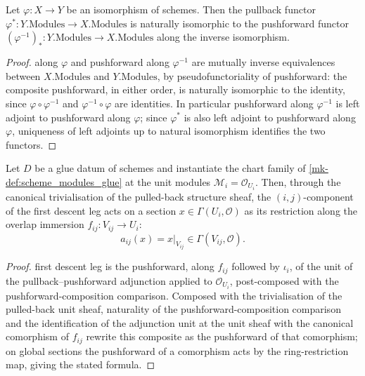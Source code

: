 \begin{lemma}
  \label{mk-lem:pullback_iso_pushforward_inv}
  \leanok
  Let \(\varphi : X \to Y\) be an isomorphism of schemes. Then the pullback
  functor \(\varphi^{*} : Y.\mathrm{Modules} \to X.\mathrm{Modules}\) is
  naturally isomorphic to the pushforward functor
  \((\varphi^{-1})_{*} : Y.\mathrm{Modules} \to X.\mathrm{Modules}\) along
  the inverse isomorphism.
\end{lemma}
\begin{proof}
  \leanokPushforward along \(\varphi\) and pushforward along \(\varphi^{-1}\) are
  mutually inverse equivalences between \(X.\mathrm{Modules}\) and
  \(Y.\mathrm{Modules}\), by pseudofunctoriality of pushforward: the
  composite pushforward, in either order, is naturally isomorphic to the
  identity, since \(\varphi \circ \varphi^{-1}\) and
  \(\varphi^{-1} \circ \varphi\) are identities. In particular pushforward
  along \(\varphi^{-1}\) is left adjoint to pushforward along \(\varphi\);
  since \(\varphi^{*}\) is also left adjoint to pushforward along
  \(\varphi\), uniqueness of left adjoints up to natural isomorphism
  identifies the two functors.
\end{proof}

\begin{lemma}
  \label{mk-lem:glue_legA_unit_restriction}
  \leanok
  Let \(D\) be a glue datum of schemes and instantiate the chart family of
  \ref{mk-def:scheme_modules_glue} at the unit modules
  \(\mathcal M_i = \mathcal O_{U_i}\). Then, through the canonical
  trivialisation of the pulled-back structure sheaf, the \((i,j)\)-component
  of the first descent leg acts on a section \(x \in \Gamma(U_i, \mathcal
  O)\) as its restriction along the overlap immersion
  \(f_{ij} : V_{ij} \to U_i\):
  \[
    a_{ij}(x) = x|_{V_{ij}} \in \Gamma(V_{ij}, \mathcal O).
  \]
\end{lemma}
\begin{proof}
  \leanokThe first descent leg is the pushforward, along \(f_{ij}\) followed by
  \(\iota_i\), of the unit of the pullback--pushforward adjunction applied to
  \(\mathcal O_{U_i}\), post-composed with the pushforward-composition
  comparison. Composed with the trivialisation of the pulled-back unit
  sheaf, naturality of the pushforward-composition comparison and the
  identification of the adjunction unit at the unit sheaf with the
  canonical comorphism of \(f_{ij}\) rewrite this composite as the
  pushforward of that comorphism; on global sections the pushforward of a
  comorphism acts by the ring-restriction map, giving the stated formula.
\end{proof}

